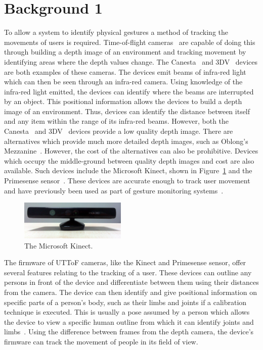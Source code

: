 \documentclass[manuscript, review, screen]{acmart}
\begin{document}
\section{Background 1} 
\label{sec:related1}



To allow a system to identify physical gestures a method of tracking the movements of users is required.
Time-of-flight cameras~\cite{Lange2001} are capable of doing this through building a depth image of an environment and tracking movement by identifying areas where the depth values change.
The Canesta~\cite{Yang2007} and 3DV~\cite{Wilson2007a} devices are both examples of these cameras.
The devices emit beams of infra-red light which can then be seen through an infra-red camera.
Using knowledge of the infra-red light emitted, the devices can identify where the beams are interrupted by an object.
This positional information allows the devices to build a depth image of an environment.
Thus, devices can identify the distance between itself and any item within the range of its infra-red beams.
However, both the Canesta~\cite{Yang2007} and 3DV~\cite{Wilson2007a} devices provide a low quality depth image.
There are alternatives which provide much more detailed depth images, such as Oblong's Mezzanine~\cite{kramer2011}.
However, the cost of the alternatives can also be prohibitive.
Devices which occupy the middle-ground between quality depth images and cost are also available.
Such devices include the Microsoft Kinect, shown in Figure~\ref{fig:kinect} and the Primesense sensor~\cite{Wilson2010}.
These devices are accurate enough to track user movement and have previously been used as part of gesture monitoring systems~\cite{Goth2011}.

\begin{figure}[h]
   \centering
   \includegraphics[width=0.45\textwidth]{figures/kinect.png}
   \caption{The Microsoft Kinect.}
   \label{fig:kinect}
\end{figure}

The firmware of \ac{UTToF} cameras, like the Kinect and Primesense sensor, offer several features relating to the tracking of a user.
These devices can outline any persons in front of the device and differentiate between them using their distances from the camera.
The device can then identify and give positional information on specific parts of a person's body, such as their limbs and joints if a calibration technique is executed.
This is usually a pose assumed by a person which allows the device to view a specific human outline from which it can identify joints and limbs~\cite{Xia2011}.
Using the difference between frames from the depth camera, the device's firmware can track the movement of people in its field of view.
\end{document}
